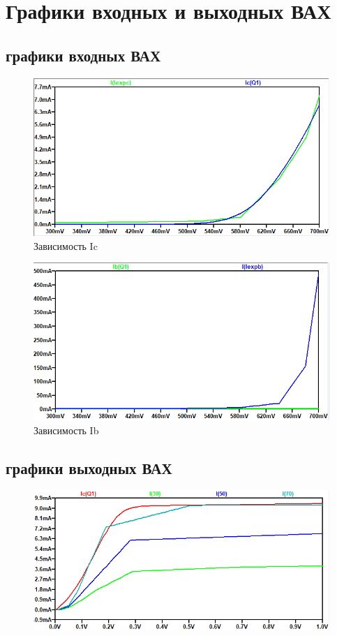 \documentclass[a4paper,14pt]{article}
\begin{document}
\section{Графики входных и выходных ВАХ}

\subsection{графики входных ВАХ}
\begin{figure}[H]
	\centering
	\includegraphics[width=0.7\linewidth]{images/graf8}
	\caption{Зависимость Ic}
	\label{fig:graf8}
\end{figure}


\begin{figure}[H]
	\centering
	\includegraphics[width=0.7\linewidth]{images/graf9}
	\caption{Зависимость Ib}
	\label{fig:graf9}
\end{figure}

\subsection{графики выходных ВАХ}

\begin{figure}[H]
	\centering
	\includegraphics[width=0.7\linewidth]{images/graf10}
	\caption{}
	\label{fig:graf10}
\end{figure}
\end{document}
